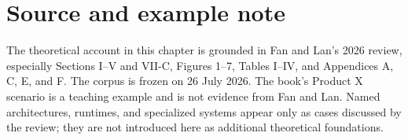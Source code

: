 \section*{Source and example note}
The theoretical account in this chapter is grounded in Fan and Lan's 2026 review, especially Sections I--V and VII-C, Figures 1--7, Tables I--IV, and Appendices A, C, E, and F. The corpus is frozen on 26 July 2026. The book's Product X scenario is a teaching example and is not evidence from Fan and Lan. Named architectures, runtimes, and specialized systems appear only as cases discussed by the review; they are not introduced here as additional theoretical foundations.
